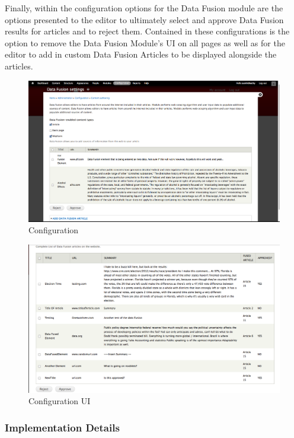 \documentclass[12pt]{article} %
\begin{document}
Finally, within the configuration options for the Data Fusion module are the options presented to the editor to ultimately select and approve Data Fusion results for articles and to reject them. Contained in these configurations is the option to remove the Data Fusion Module’s UI on all pages as well as for the editor to add in custom Data Fusion Articles to be displayed alongside the articles.

\begin{figure}[htbp]
\begin{center}
\includegraphics[width=6in]{images/config}
\caption{Configuration}
\end{center}
\end{figure}

\begin{figure}[htbp]
\begin{center}
\includegraphics[width=6in]{images/configUI}
\caption{Configuration UI}
\end{center}
\end{figure}

\subsubsection{Implementation Details}
\end{document}
